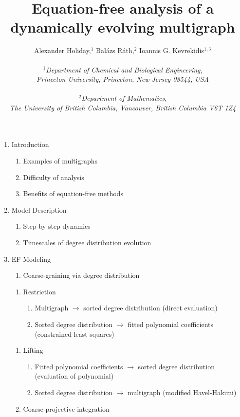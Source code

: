 \documentclass[12pt]{article}
\title{\vspace{-2cm}Equation-free analysis of a dynamically evolving multigraph}
\author{Alexander Holiday,$^1$ Bal\'{a}zs R\'{a}th,$^2$ Ioannis G. Kevrekidis$^{1,3}$ \\ \\
  $^1$\textit{Department of Chemical and Biological Engineering}, \\
  \textit{Princeton University, Princeton, New Jersey 08544, USA} \\ \\
  $^2$\textit{Department of Mathematics}, \\
  \textit{The University of British Columbia, Vancouver, British Columbia V6T 1Z4}
}
\date{}
\begin{document}
\maketitle
\begin{singlespace}
\vspace{-5mm}
  \begin{enumerate}
  \item Introduction
    \begin{enumerate}
    \item Examples of multigraphs
    \item Difficulty of analysis
    \item Benefits of equation-free methods
    \end{enumerate}
  \item Model Description
    \begin{enumerate}
    \item Step-by-step dynamics
    \item Timescales of degree distribution evolution
    \end{enumerate}
  \item EF Modeling
    \begin{enumerate}
    \item Coarse-graining via degree distribution
    \end{enumerate}
    \begin{enumerate}
    \item Restriction
      \begin{enumerate}
      \item Multigraph $\rightarrow$ sorted degree distribution (direct evaluation)
      \item Sorted degree distribution $\rightarrow$ fitted polynomial coefficients (constrained least-squares)
      \end{enumerate}
    \end{enumerate}
    \begin{enumerate}
    \item Lifting
      \begin{enumerate}
      \item Fitted polynomial coefficients $\rightarrow$ sorted degree distribution  (evaluation of polynomial)
      \item Sorted degree distribution $\rightarrow$  multigraph (modified Havel-Hakimi)
      \end{enumerate}
    \item Coarse-projective integration
    \end{enumerate}

\end{enumerate}
\end{singlespace}
\end{document}
